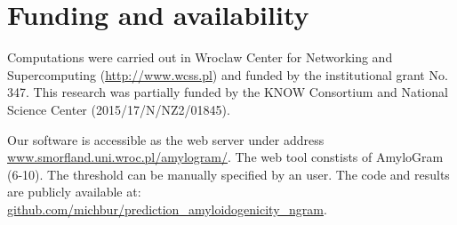 \documentclass[fleqn,10pt,twoside]{gcb15submission}
\begin{document}
\section*{Funding and availability}

Computations were carried out in Wroclaw Center for Networking and 
Supercomputing (\url{http://www.wcss.pl}) and funded by the institutional grant 
No. 347. This research was partially funded by the KNOW Consortium and National 
Science Center (2015/17/N/NZ2/01845).

  Our software is accessible as the web server under address 
\url{www.smorfland.uni.wroc.pl/amylogram/}. The web tool constists of AmyloGram 
(6-10). The threshold can be manually specified by an user. The code and 
results are publicly available at: 
\url{github.com/michbur/prediction_amyloidogenicity_ngram}.


\end{document}
